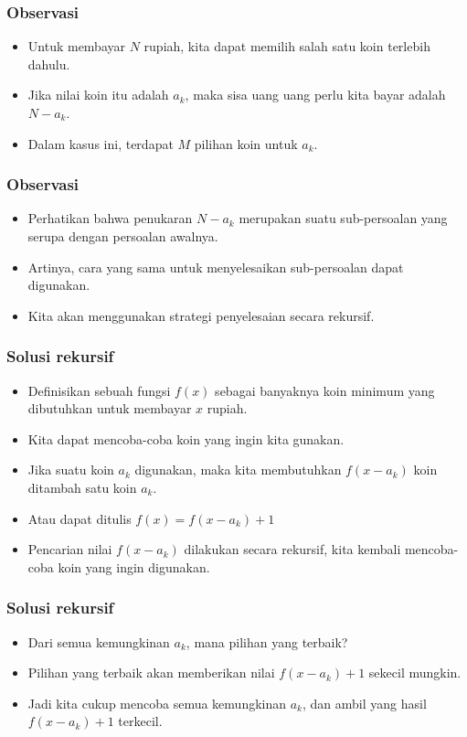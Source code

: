 \begin{frame}
\frametitle{Observasi}
\begin{itemize}
  \item Untuk membayar $N$ rupiah, kita dapat memilih salah satu koin terlebih dahulu.
  \item Jika nilai koin itu adalah $a_k$, maka sisa uang uang perlu kita bayar adalah $N-a_k$.
  \item Dalam kasus ini, terdapat $M$ pilihan koin untuk $a_k$.
\end{itemize}
\end{frame}

\begin{frame}
\frametitle{Observasi}
\begin{itemize}
  \item Perhatikan bahwa penukaran $N - a_k$ merupakan suatu sub-persoalan yang serupa dengan persoalan awalnya.
  \item Artinya, cara yang sama untuk menyelesaikan sub-persoalan dapat digunakan.
  \item Kita akan menggunakan strategi penyelesaian secara rekursif.
\end{itemize}
\end{frame}

\begin{frame}
\frametitle{Solusi rekursif}
\begin{itemize}
  \item Definisikan sebuah fungsi $f(x)$ sebagai banyaknya koin minimum yang dibutuhkan untuk membayar $x$ rupiah.
  \item Kita dapat mencoba-coba koin yang ingin kita gunakan.
  \item Jika suatu koin $a_k$ digunakan, maka kita membutuhkan $f(x-a_k)$ koin ditambah satu koin $a_k$.
  \item Atau dapat ditulis $f(x) = f(x-a_k) + 1$
  \item Pencarian nilai $f(x-a_k)$ dilakukan secara rekursif, kita kembali mencoba-coba koin yang ingin digunakan.
\end{itemize}
\end{frame}

\begin{frame}
\frametitle{Solusi rekursif}
\begin{itemize}
  \item Dari semua kemungkinan $a_k$, mana pilihan yang terbaik?
  \item Pilihan yang terbaik akan memberikan nilai $f(x - a_k) + 1$ sekecil mungkin.
  \item Jadi kita cukup mencoba semua kemungkinan $a_k$, dan ambil yang hasil $f(x - a_k) + 1$ terkecil.
\end{itemize}
\end{frame}


